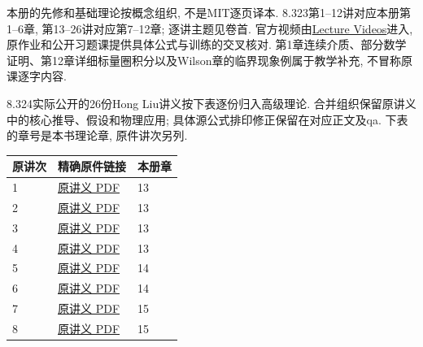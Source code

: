 \label{ch:source-map}
本册的先修和基础理论按概念组织, 不是MIT逐页译本. 8.323第1--12讲对应本册第1--6章, 第13--26讲对应第7--12章; 逐讲主题见卷首. 官方视频由\href{https://ocw.mit.edu/courses/8-323-relativistic-quantum-field-theory-i-spring-2023/resources/lecture-videos/index.html}{Lecture Videos}进入, 原作业和公开习题课提供具体公式与训练的交叉核对. 第1章连续介质、部分数学证明、第12章详细标量圈积分以及Wilson章的临界现象例属于教学补充, 不冒称原课逐字内容.

8.324实际公开的26份Hong Liu讲义按下表逐份归入高级理论. 合并组织保留原讲义中的核心推导、假设和物理应用; 具体源公式排印修正保留在对应正文及qa. 下表的章号是本书理论章, 原件讲次另列.
\begin{longtable}{@{}p{.15\linewidth}p{.54\linewidth}p{.21\linewidth}@{}}
\toprule 原讲次&精确原件链接&本册章\\\midrule\endhead
1 & \href{https://ocw.mit.edu/courses/8-324-relativistic-quantum-field-theory-ii-fall-2010/55d5413e73d973bc458b8e1313124c38_MIT8_324F10_Lecture1.pdf}{原讲义 PDF} & 13 \\
2 & \href{https://ocw.mit.edu/courses/8-324-relativistic-quantum-field-theory-ii-fall-2010/b29379aced2b46bbe9f2715922d72b10_MIT8_324F10_Lecture2.pdf}{原讲义 PDF} & 13 \\
3 & \href{https://ocw.mit.edu/courses/8-324-relativistic-quantum-field-theory-ii-fall-2010/fa941a1dfc792c352ff23669a23f02de_MIT8_324F10_Lecture3.pdf}{原讲义 PDF} & 13 \\
4 & \href{https://ocw.mit.edu/courses/8-324-relativistic-quantum-field-theory-ii-fall-2010/037bee6805af5c342ec137afeb631a9c_MIT8_324F10_Lecture4.pdf}{原讲义 PDF} & 13 \\
5 & \href{https://ocw.mit.edu/courses/8-324-relativistic-quantum-field-theory-ii-fall-2010/1b3e727b1edcd9b2f41182a3d8438701_MIT8_324F10_Lecture5.pdf}{原讲义 PDF} & 14 \\
6 & \href{https://ocw.mit.edu/courses/8-324-relativistic-quantum-field-theory-ii-fall-2010/573db088e154cfa40d05a4b471461a28_MIT8_324F10_Lecture6.pdf}{原讲义 PDF} & 14 \\
7 & \href{https://ocw.mit.edu/courses/8-324-relativistic-quantum-field-theory-ii-fall-2010/5b5cf13e21682d4ee52df89ddbe87d1a_MIT8_324F10_Lecture7.pdf}{原讲义 PDF} & 15 \\
8 & \href{https://ocw.mit.edu/courses/8-324-relativistic-quantum-field-theory-ii-fall-2010/a6474b32e25c000dec30c9a737ef0e05_MIT8_324F10_Lecture8.pdf}{原讲义 PDF} & 15 \\

\end{longtable}
